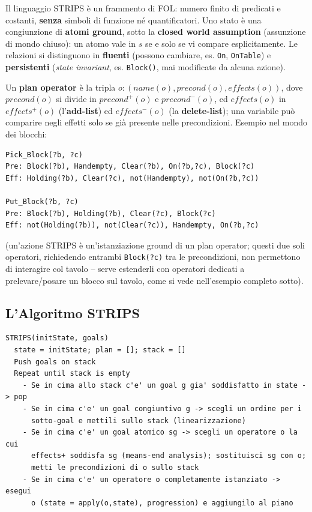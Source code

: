 \documentclass[a4paper,11pt]{article}
\begin{document}
Il linguaggio STRIPS è un frammento di FOL: numero finito di predicati e costanti, \textbf{senza} simboli di funzione né quantificatori. Uno stato è una congiunzione di \textbf{atomi ground}, sotto la \textbf{closed world assumption} (assunzione di mondo chiuso): un atomo vale in $s$ se e solo se vi compare esplicitamente. Le relazioni si distinguono in \textbf{fluenti} (possono cambiare, es. \texttt{On}, \texttt{OnTable}) e \textbf{persistenti} (\emph{state invariant}, es. \texttt{Block()}, mai modificate da alcuna azione).

Un \textbf{plan operator} è la tripla $o:(name(o),precond(o),effects(o))$, dove $precond(o)$ si divide in $precond^+(o)$ e $precond^-(o)$, ed $effects(o)$ in $effects^+(o)$ (l'\textbf{add-list}) ed $effects^-(o)$ (la \textbf{delete-list}); una variabile può comparire negli effetti solo se già presente nelle precondizioni. Esempio nel mondo dei blocchi:
\begin{lstlisting}
Pick_Block(?b, ?c)
Pre: Block(?b), Handempty, Clear(?b), On(?b,?c), Block(?c)
Eff: Holding(?b), Clear(?c), not(Handempty), not(On(?b,?c))

Put_Block(?b, ?c)
Pre: Block(?b), Holding(?b), Clear(?c), Block(?c)
Eff: not(Holding(?b)), not(Clear(?c)), Handempty, On(?b,?c)
\end{lstlisting}
(un'azione STRIPS è un'istanziazione ground di un plan operator; questi due soli operatori, richiedendo entrambi \texttt{Block(?c)} tra le precondizioni, non permettono di interagire col tavolo -- serve estenderli con operatori dedicati a prelevare/posare un blocco sul tavolo, come si vede nell'esempio completo sotto).

\subsection{L'Algoritmo STRIPS}

\begin{lstlisting}
STRIPS(initState, goals)
  state = initState; plan = []; stack = []
  Push goals on stack
  Repeat until stack is empty
    - Se in cima allo stack c'e' un goal g gia' soddisfatto in state -> pop
    - Se in cima c'e' un goal congiuntivo g -> scegli un ordine per i
      sotto-goal e mettili sullo stack (linearizzazione)
    - Se in cima c'e' un goal atomico sg -> scegli un operatore o la cui
      effects+ soddisfa sg (means-end analysis); sostituisci sg con o;
      metti le precondizioni di o sullo stack
    - Se in cima c'e' un operatore o completamente istanziato -> esegui
      o (state = apply(o,state), progression) e aggiungilo al piano
\end{lstlisting}
\end{document}
